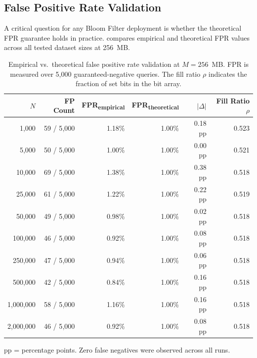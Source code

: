 \subsection{False Positive Rate Validation}
\label{subsec:fpr}

A critical question for any Bloom Filter deployment is whether the theoretical FPR guarantee holds in practice.  compares empirical and theoretical FPR values across all tested dataset sizes at 256~MB.

\begin{table}[t]
\centering
\caption{Empirical vs.\ theoretical false positive rate validation at $M = 256$~MB. FPR is measured over 5{,}000 guaranteed-negative queries. The fill ratio $\rho$ indicates the fraction of set bits in the bit array.}
\label{tab:fpr_validation}
\begin{tabular}{@{}r r r r r r@{}}
\toprule
\textbf{$N$} & \textbf{FP Count} & \textbf{FPR\textsubscript{empirical}} & \textbf{FPR\textsubscript{theoretical}} & \textbf{$|\Delta|$} & \textbf{Fill Ratio $\rho$} \\
\midrule
1{,}000      & 59 / 5{,}000  & 1.18\% & 1.00\% & 0.18 pp & 0.523 \\
5{,}000      & 50 / 5{,}000  & 1.00\% & 1.00\% & 0.00 pp & 0.521 \\
10{,}000     & 69 / 5{,}000  & 1.38\% & 1.00\% & 0.38 pp & 0.518 \\
25{,}000     & 61 / 5{,}000  & 1.22\% & 1.00\% & 0.22 pp & 0.519 \\
50{,}000     & 49 / 5{,}000  & 0.98\% & 1.00\% & 0.02 pp & 0.518 \\
100{,}000    & 46 / 5{,}000  & 0.92\% & 1.00\% & 0.08 pp & 0.518 \\
250{,}000    & 47 / 5{,}000  & 0.94\% & 1.00\% & 0.06 pp & 0.518 \\
500{,}000    & 42 / 5{,}000  & 0.84\% & 1.00\% & 0.16 pp & 0.518 \\
1{,}000{,}000 & 58 / 5{,}000 & 1.16\% & 1.00\% & 0.16 pp & 0.518 \\
2{,}000{,}000 & 46 / 5{,}000 & 0.92\% & 1.00\% & 0.08 pp & 0.518 \\
\bottomrule
\end{tabular}

\vspace{0.3em}
\footnotesize{pp = percentage points. Zero false negatives were observed across all runs.}
\end{table}

